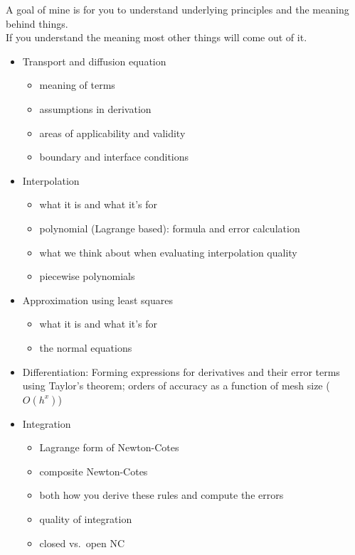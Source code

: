\documentclass[12pt]{article}
\begin{document}
A goal of mine is for you to understand underlying principles and the meaning behind things. \\
If you understand the meaning most other things will come out of it.
\begin{itemize}
\item Transport and diffusion equation
  \begin{itemize}
  \item meaning of terms
  \item assumptions in derivation
  \item areas of applicability and validity
  \item boundary and interface conditions
  \end{itemize}

\item Interpolation 
  \begin{itemize}
  \item what it is and what it's for  
  \item polynomial (Lagrange based): formula and error calculation 
  \item what we think about when evaluating interpolation quality
  \item piecewise polynomials
  \end{itemize}

\item Approximation using least squares
  \begin{itemize}
  \item what it is and what it's for  
  \item the normal equations
  \end{itemize}

\item Differentiation: Forming expressions for derivatives and their error terms using Taylor's theorem; orders of accuracy as a function of mesh size ($O(h^{x})$)

\item Integration
  \begin{itemize}
  \item Lagrange form of Newton-Cotes
  \item composite Newton-Cotes
  \item both how you derive these rules and compute the errors
  \item quality of integration
  \item closed vs.\ open NC
  \end{itemize}


\end{itemize}
\end{document}
